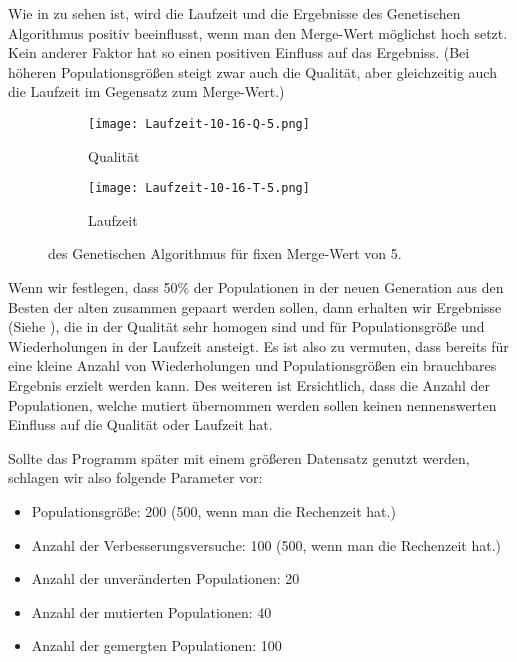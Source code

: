 Wie in  zu sehen ist, wird die Laufzeit und die Ergebnisse des Genetischen Algorithmus positiv beeinflusst,
wenn man den Merge-Wert möglichst hoch setzt. Kein anderer Faktor hat so einen positiven Einfluss auf das Ergebniss.
(Bei höheren Populationsgrößen steigt zwar auch die Qualität, aber gleichzeitig auch die Laufzeit im Gegensatz zum Merge-Wert.)

\begin{figure}
  \begin{subfigure}{\textwidth}
  \texttt{[image: Laufzeit-10-16-Q-5.png]}
  \caption{Qualität}
  \label{fig:QualitätMerge5}
  \end{subfigure}

  \begin{subfigure}{\textwidth}
  \texttt{[image: Laufzeit-10-16-T-5.png]}
  \caption{Laufzeit}
  \label{fig:LaufzeitMerge5}
  \end{subfigure}
\caption{des Genetischen Algorithmus für fixen Merge-Wert von 5.\protect}
\label{fig:GenAlgMerge5}
\end{figure}

Wenn wir festlegen, dass 50\% der Populationen in der neuen Generation aus den Besten der alten zusammen gepaart werden sollen,
dann erhalten wir Ergebnisse (Siehe ), die in der Qualität sehr homogen sind und für Populationsgröße
und Wiederholungen in der Laufzeit ansteigt.
Es ist also zu vermuten, dass bereits für eine kleine Anzahl von Wiederholungen und Populationsgrößen
ein brauchbares Ergebnis erzielt werden kann.
Des weiteren ist Ersichtlich, dass die Anzahl der Populationen, welche mutiert übernommen werden sollen
keinen nennenswerten Einfluss auf die Qualität oder Laufzeit hat.


Sollte das Programm später mit einem größeren Datensatz genutzt werden, schlagen wir also folgende Parameter vor:
  \begin{itemize}
\itemsep2pt
  \item Populationsgröße: 200 (500, wenn man die Rechenzeit hat.)
  \item Anzahl der Verbesserungsversuche: 100 (500, wenn man die Rechenzeit hat.)
  \item Anzahl der unveränderten Populationen: 20
  \item Anzahl der mutierten Populationen: 40
  \item Anzahl der gemergten Populationen: 100
  \end{itemize}
